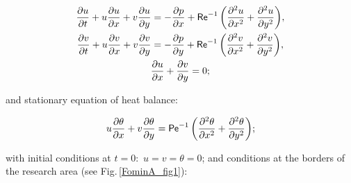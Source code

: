 %

\begin{gather*}

 \frac{\partial u}{\partial t} + u \frac{\partial u}{\partial x} + v \frac{\partial u}{\partial y} = - \frac{\partial p}{\partial x} + {\sf Re}^{-1} \left(\frac{\partial^2 u}{\partial x^2} + \frac{\partial^2 u}{\partial y^2} \right)\!,\\

  \frac{\partial v}{\partial t} + u \frac{\partial v}{\partial x} + v \frac{\partial v}{\partial y} = - \frac{\partial p}{\partial y} + {\sf Re}^{-1} \left(\frac{\partial^2 v}{\partial x^2} + \frac{\partial^2 v}{\partial y^2} \right)\!,\\

 \frac{\partial u}{\partial x} + \frac{\partial v}{\partial y} = 0;

\end{gather*}

\noindent and stationary equation of heat balance:

\begin{gather*}

 u \frac{\partial \theta}{\partial x} + v \frac{\partial \theta}{\partial y} = {\sf Pe}^{-1} \left(\frac{\partial^2 \theta}{\partial x^2} + \frac{\partial^2 \theta}{\partial y^2} \right)\!;

\end{gather*}

\noindent with initial conditions at $t=0$:\ $u = v = \theta = 0$; and conditions at the borders of the research area (see Fig.\,\ref{FominA_fig1}):

